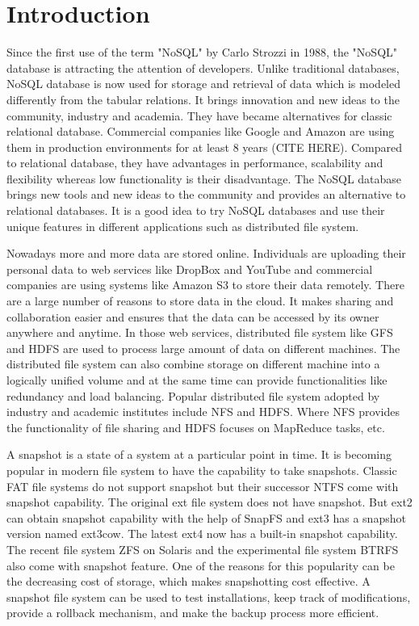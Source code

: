 \chapter{Introduction}
\label{chap:intro}

    Since the first use of the term "NoSQL" by Carlo Strozzi in 1988, the "NoSQL" database is attracting the attention of developers. Unlike traditional databases, NoSQL database is now used for storage and retrieval of data which is modeled differently from the tabular relations. It brings innovation and new ideas to the community, industry and academia. They have became alternatives for classic relational database. Commercial companies like Google and Amazon are using them in production environments for at least 8 years (CITE HERE). Compared to relational database, they have advantages in performance, scalability and flexibility whereas low functionality is their disadvantage. The NoSQL database brings new tools and new ideas to the community and provides an alternative to relational databases. It is a good idea to try NoSQL databases and use their unique features in different applications such as distributed file system.

    Nowadays more and more data are stored online. Individuals are uploading their personal data to web services like DropBox and YouTube and commercial companies are using systems like Amazon S3 to store their data remotely. There are a large number of reasons to store data in the cloud. It makes sharing and collaboration easier and ensures that the data can be accessed by its owner anywhere and anytime. In those web services, distributed file system like GFS and HDFS are used to process large amount of data on different machines. The distributed file system can also combine storage on different machine into a logically unified volume and at the same time can provide functionalities like redundancy and load balancing. Popular distributed file system adopted by industry and academic institutes include NFS and HDFS. Where NFS provides the functionality of file sharing and HDFS focuses on MapReduce tasks, etc.

    A snapshot is a state of a system at a particular point in time. It is becoming popular in modern file system to have the capability to take snapshots. Classic FAT file systems do not support snapshot but their successor NTFS come with snapshot capability. The original ext file system does not have snapshot. But ext2 can obtain snapshot capability with the help of SnapFS and ext3 has a snapshot version named ext3cow. The latest ext4 now has a built-in snapshot capability. The recent file system ZFS on Solaris and the experimental file system BTRFS also come with snapshot feature. One of the reasons for this popularity can be the decreasing cost of storage, which makes snapshotting cost effective. A snapshot file system can be used to test installations, keep track of modifications, provide a rollback mechanism, and make the backup process more efficient.

